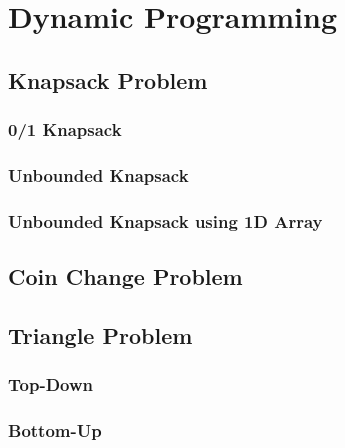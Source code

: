 \section{Dynamic Programming}

\subsection{Knapsack Problem}

\subsubsection{0/1 Knapsack}


\subsubsection{Unbounded Knapsack}


\subsubsection{Unbounded Knapsack using 1D Array}



\subsection{Coin Change Problem}



\clearpage


\subsection{Triangle Problem}

\subsubsection{Top-Down}


\subsubsection{Bottom-Up}



\clearpage


